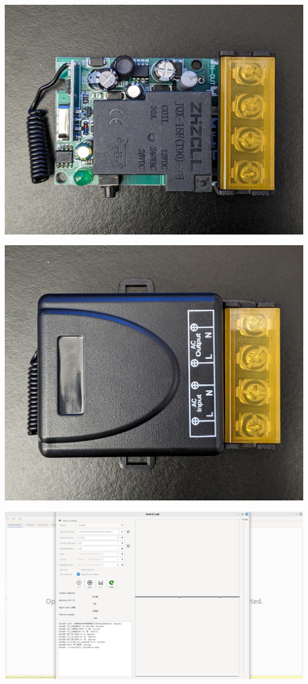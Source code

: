 \documentclass{beamer}
\begin{document}
\begin{frame}
\includegraphics[width=\textwidth]{../Pics/device/relay_front_bare.jpg}
\end{frame}

\begin{frame}
\includegraphics[width=\textwidth]{../Pics/device/relay_front_case.jpg}
\end{frame}

\begin{frame}
\includegraphics[width=\textwidth]{../Pics/screenshots/URH-setup.png}
\end{frame}
\end{document}
